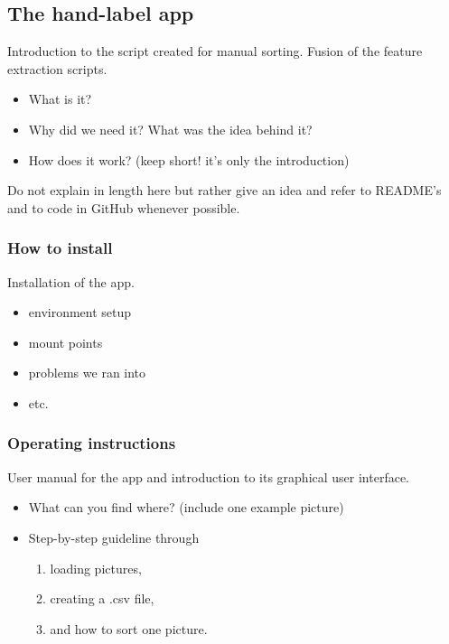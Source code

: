 \subsection{The hand-label app}

Introduction to the script created for manual sorting. Fusion of the feature extraction scripts.

\begin{itemize}
\item What is it?
\item Why did we need it? What was the idea behind it?
\item How does it work? (keep short! it's only the introduction)
\end{itemize}

Do not explain in length here but rather give an idea and refer to README's and to code in GitHub whenever possible.


\subsubsection{How to install}

Installation of the app.

\begin{itemize}
\item environment setup
\item mount points
\item problems we ran into
\item etc.
\end{itemize}


\subsubsection{Operating instructions}

User manual for the app and introduction to its graphical user interface.

\begin{itemize}
\item What can you find where? (include one example picture)
\item Step-by-step guideline through

\begin{enumerate}
\item loading pictures,
\item creating a .csv file,
\item and how to sort one picture.
\end{enumerate}

\end{itemize}


